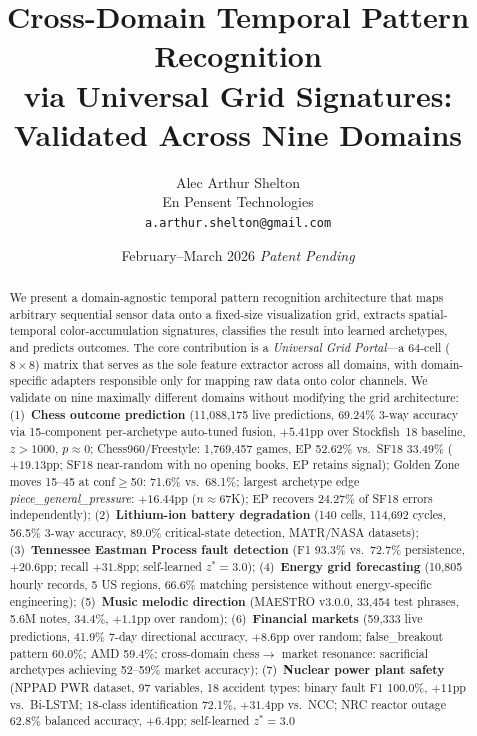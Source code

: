 \documentclass[12pt,a4paper]{article}
\title{\textbf{Cross-Domain Temporal Pattern Recognition\\via Universal Grid Signatures:\\
Validated Across Nine Domains}}
\author{
  Alec Arthur Shelton\\
  En Pensent Technologies\\
  \texttt{a.arthur.shelton@gmail.com}
}
\date{February--March 2026 \quad \textit{Patent Pending}}
\begin{document}
\maketitle

\begin{abstract}
We present a domain-agnostic temporal pattern recognition architecture that maps arbitrary
sequential sensor data onto a fixed-size visualization grid, extracts spatial-temporal
color-accumulation signatures, classifies the result into learned archetypes, and predicts
outcomes. The core contribution is a \emph{Universal Grid Portal}---a 64-cell ($8{\times}8$)
matrix that serves as the sole feature extractor across all domains, with domain-specific
adapters responsible only for mapping raw data onto color channels. We validate on nine
maximally different domains without modifying the grid architecture:
(1)~\textbf{Chess outcome prediction} (11,088,175 live predictions, 69.24\% 3-way accuracy via
15-component per-archetype auto-tuned fusion, $+5.41$pp over Stockfish~18 baseline,
$z{>}1000$, $p{\approx}0$; Chess960/Freestyle: 1,769,457 games, EP 52.62\% vs.\ SF18 33.49\%
($+19.13$pp; SF18 near-random with no opening books, EP retains signal);
Golden Zone moves 15--45 at conf$\geq$50: 71.6\% vs.\ 68.1\%;
largest archetype edge \textit{piece\_general\_pressure}: $+16.44$pp ($n{\approx}67$K); EP
recovers 24.27\% of SF18 errors independently);
(2)~\textbf{Lithium-ion battery degradation} (140 cells, 114,692 cycles, 56.5\% 3-way accuracy,
89.0\% critical-state detection, MATR/NASA datasets);
(3)~\textbf{Tennessee Eastman Process fault detection} (F1 93.3\% vs.\ 72.7\% persistence,
$+20.6$pp; recall $+31.8$pp; self-learned $z^*{=}3.0$);
(4)~\textbf{Energy grid forecasting} (10,805 hourly records, 5 US regions, 66.6\% matching
persistence without energy-specific engineering);
(5)~\textbf{Music melodic direction} (MAESTRO v3.0.0, 33,454 test phrases, 5.6M notes, 34.4\%,
$+1.1$pp over random);
(6)~\textbf{Financial markets} (59,333 live predictions, 41.9\% 7-day directional accuracy,
$+8.6$pp over random; false\_breakout pattern 60.0\%; AMD 59.4\%; cross-domain chess$\rightarrow$
market resonance: sacrificial archetypes achieving 52--59\% market accuracy);
(7)~\textbf{Nuclear power plant safety} (NPPAD PWR dataset, 97 variables, 18 accident types:
binary fault F1 100.0\%, $+11$pp vs.\ Bi-LSTM; 18-class identification 72.1\%, $+31.4$pp vs.\
NCC; NRC reactor outage 62.8\% balanced accuracy, $+6.4$pp; self-learned $z^*{=}3.0$

\end{abstract}
\end{document}
